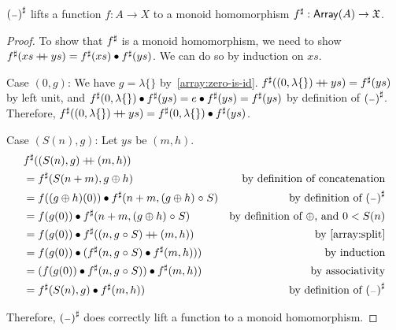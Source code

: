 \begin{propositionrep}
    ${({\scriptstyle{-}})}^{\sharp}$ lifts a function $f : A \to X$ to a monoid homomorphism ${f}^{\sharp} : \operatorname{\mathsf{Array}}(A) \to \mathfrak{X}$.
\end{propositionrep}

\begin{proof}
    To show that ${f}^{\sharp}$ is a monoid homomorphism,
    we need to show ${f}^{\sharp}(xs \mathbin{+\kern -0.4em+} ys) = {f}^{\sharp}(xs) \mathbin{\bullet} {f}^{\sharp}(ys)$.
    We can do so by induction on $xs$.

    Case $(0, g)$:
    We have $g = \lambda\{\}$ by~\ref{array:zero-is-id}.
    ${f}^{\sharp}((0, \lambda\{\}) \mathbin{+\kern -0.4em+} ys) = {f}^{\sharp}(ys)$ by left unit,
    and ${f}^{\sharp}(0, \lambda\{\}) \mathbin{\bullet} {f}^{\sharp}(ys) = e \mathbin{\bullet} {f}^{\sharp}(ys) = {f}^{\sharp}(ys)$
    by definition of ${({\scriptstyle{-}})}^{\sharp}$. Therefore,
    ${f}^{\sharp}((0, \lambda\{\}) \mathbin{+\kern -0.4em+} ys) = {f}^{\sharp}(0, \lambda\{\}) \mathbin{\bullet} {f}^{\sharp}(ys)$.

    Case $(S(n), g)$: Let $ys$ be $(m, h)$.
    \begin{align*}
         & {f}^{\sharp}((S(n), g) \mathbin{+\kern -0.4em+} (m, h))                                                                              \\
         & = {f}^{\sharp}(S(n + m), g \oplus h)                                 & \text{by definition of concatenation}            \\
         & = f((g \oplus h)(0)) \mathbin{\bullet} {f}^{\sharp}(n + m, (g \oplus h) \mathrel{\circ} S) & \text{by definition of ${({\scriptstyle{-}})}^{\sharp}$}         \\
         & = f(g(0)) \mathbin{\bullet} {f}^{\sharp}(n + m, (g \oplus h) \mathrel{\circ} S)            & \text{by definition of $\oplus$, and $0 < S(n)$} \\
         & = f(g(0)) \mathbin{\bullet} {f}^{\sharp}((n, g \mathrel{\circ} S) \mathbin{+\kern -0.4em+} (m, h))      & \text{by~\ref{array:split}}                      \\
         & = f(g(0)) \mathbin{\bullet} ({f}^{\sharp}(n, g \mathrel{\circ} S) \mathbin{\bullet} {f}^{\sharp}(m, h)))    & \text{by induction}                              \\
         & = (f(g(0)) \mathbin{\bullet} {f}^{\sharp}(n, g \mathrel{\circ} S)) \mathbin{\bullet} {f}^{\sharp}(m, h))    & \text{by associativity}                          \\
         & = {f}^{\sharp}(S(n), g) \mathbin{\bullet} {f}^{\sharp}(m, h))                         & \text{by definition of ${({\scriptstyle{-}})}^{\sharp}$}         \\
    \end{align*}

    Therefore, ${({\scriptstyle{-}})}^{\sharp}$ does correctly lift a function to a monoid homomorphism.
\end{proof}

